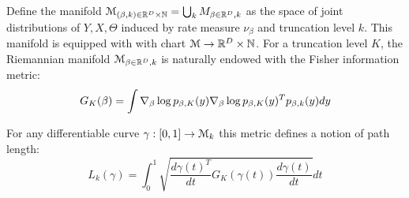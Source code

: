 \documentclass[letterpaper]{article}
\begin{document}
Define the manifold $\mathcal{M}_{(\beta,k)\in\mathbb{R}^D\times\mathbb{N}}=\bigcup_k M_{\beta\in\mathbb{R}^D,k}$ as the space of  joint distributions of $Y,X,\Theta$ induced by rate measure $\nu_\beta$ and truncation level $k$. This manifold is equipped with with chart $\mathcal{M}\rightarrow\mathbb{R}^D\times\mathbb{N}$.  For a truncation level $K$, the Riemannian manifold $\mathcal{M}_{\beta\in\mathbb{R}^D,k}$ is naturally endowed with the Fisher information metric:
\[
	G_K(\beta)=\int\nabla_\beta\log p_{\beta,K}(y)\nabla_\beta\log p_{\beta,K}(y)^Tp_{\beta,k}(y)dy
\]

For any differentiable curve $\gamma:[0,1]\rightarrow\mathcal{M}_k$ this metric defines a notion of path length:
\[
	L_k(\gamma)=\int_0^1\sqrt{\frac{d\gamma(t)^T}{dt}G_K(\gamma(t))\frac{d\gamma(t)}{dt}}dt
\]



{
\small


}
\end{document}
